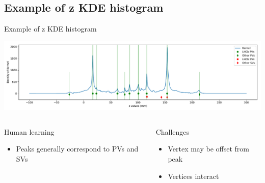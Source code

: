 \subsection{Example of z KDE histogram}
\begin{frame}{Example of z KDE histogram}
\begin{center}
    \includegraphics[width=\textwidth, trim=50 30 50 30]{images/kernel_and_pvs.pdf}
\end{center}
\begin{columns}[t]
    \begin{block}{Human learning}
    \begin{itemize}
        \item Peaks generally correspond to PVs and SVs
    \end{itemize}
    \end{block}
    
    \begin{block}{Challenges}
    \begin{itemize}
        \item Vertex may be offset from peak
        \item Vertices interact
    \end{itemize}
    \end{block}
\end{columns}
\end{frame}


